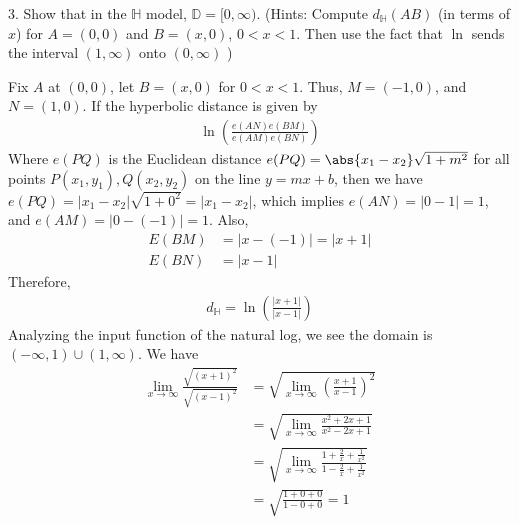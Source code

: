 \documentclass{report}
\begin{document}
    \bigbreak \noindent 
    \begin{mdframed}
        3. Show that in the $\mathbb{H}$ model, $\mathbb{D} = [0,\infty)$. (Hints: Compute $d_{\mathbb{H}}(AB)$ (in terms of $x$) for $A=(0,0)$ and $B=(x,0)$, $0<x<1$. Then use the fact that $\ln$ sends the interval $(1,\infty)$ onto $(0,\infty)$ )
    \end{mdframed}
    \bigbreak \noindent 
    Fix $A$ at $(0,0)$, let $B = (x,0)$ for $ 0 < x < 1$. Thus, $M = (-1,0)$, and $N = (1,0)$. If the hyperbolic distance is given by
    \begin{align*}
        \ln{\left(\frac{e(AN)e(BM)}{e(AM)e(BN)}\right)}
    \end{align*}
    Where $e(PQ)$ is the Euclidean distance $e(PQ) = \abs{x_{1} -x_{2}}\sqrt{1+m^{2}}$ for all points $P(x_{1}, y_{1}), Q(x_{2}, y_{2})$ on the line $y=mx+b$, then we have $e(PQ) = \left\lvert x_{1} - x_{2} \right\rvert \sqrt{1+0^{2}} = \left\lvert x_{1} - x_{2} \right\rvert$, which implies $e(AN) = \left\lvert 0 - 1 \right\rvert =1$, and $e(AM) = \left\lvert 0 - (-1)\right\rvert  = 1$.
    \bigbreak \noindent 
    Also, 
    \begin{align*}
        E(BM) &= \left\lvert x-(-1) \right\rvert = \left\lvert x+1 \right\rvert \\
        E(BN) &= \left\lvert x -1 \right\rvert
    \end{align*}
    \bigbreak \noindent 
    Therefore,
    \begin{align*}
        d_{\mathbb{H}} = \ln{\left(\frac{\left\lvert x+1 \right\rvert}{\left\lvert x-1 \right\rvert}\right)}
    \end{align*}
    Analyzing the input function of the natural log, we see the domain is $(-\infty, 1) \cup (1,\infty)$. We have
    \begin{align*}
        \lim\limits_{x \to \infty}{\frac{\sqrt{(x+1)^{2}}}{\sqrt{(x-1)^{2}}}} &= \sqrt{\lim\limits_{x \to \infty}{\left(\frac{x+1}{x-1}\right)^{2}}} \\
                                                                              &= \sqrt{\lim\limits_{x \to \infty}{\frac{x^{2} + 2x + 1}{x^{2} -2x +1}}} \\
                                                                              &= \sqrt{\lim\limits_{x \to \infty}{\frac{1 + \frac{2}{x} + \frac{1}{x^{2}}}{1 - \frac{2}{x} + \frac{1}{x^{2}}}}} \\
                                                                              &= \sqrt{\frac{1 + 0 + 0 }{1 - 0+ 0}} = 1
    \end{align*}
\end{document}
